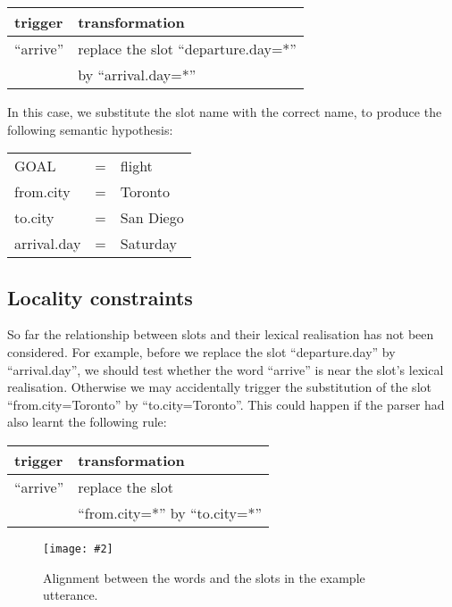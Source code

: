 \documentclass{article}
\newcommand{\fgrparam}[4]{
  \begin{figure}[htbp]
    \begin{center}
      \leavevmode
      \texttt{[image: \#2]}
    \end{center}
    \vspace{-0.5cm}
    \caption{#4}
    \label{#3}
  \end{figure}
}
\begin{document}
\vspace{.15cm}
\begin{tabular}{ll}
  trigger & transformation \\
  \hline 
  ``arrive''            & replace the slot ``departure.day=*'' \\
                        & by ``arrival.day=*'' \\
\end{tabular} 
\vspace{.15cm}

In this case, we substitute the slot name with the correct name, to produce the following semantic hypothesis:

\vspace{.15cm}
\begin{tabular}{lll}
  GOAL          & = & flight \\
  from.city     & = & Toronto \\
  to.city       & = & San Diego \\
  arrival.day   & = & Saturday \\
\end{tabular} 

\subsection{Locality constraints} \label{sec:locality:constrain}
So far the relationship between slots and their lexical realisation has not been considered. For example, before we replace the slot ``departure.day'' by ``arrival.day'', we should test whether the word ``arrive'' is near the slot's lexical realisation. Otherwise we may accidentally trigger the substitution of the slot ``from.city=Toronto'' by ``to.city=Toronto''. This could happen if the parser had also learnt the following rule:

\vspace{.15cm}
\begin{tabular}{ll}
  trigger & transformation \\
  \hline 
  ``arrive''            & replace the slot \\
                        & ``from.city=*'' by ``to.city=*'' \\
\end{tabular} 
\vspace{.15cm}
\fgrparam{width=8cm}{./fig/words-slots-alignment.pdf}{fig:alignment}{Alignment between the words and the slots in the example utterance.}

\end{document}
